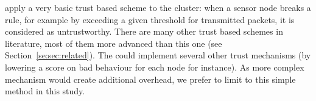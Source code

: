 \cns apply a very basic trust based scheme to the cluster: when a sensor node breaks a rule, for example by exceeding a given threshold for transmitted packets, it is considered as untrustworthy.
There are many other trust based schemes in literature, most of them more advanced than this one (see Section~\ref{se:sec:related}).
The \cns could implement several other trust mechanisms (by lowering a score on bad behaviour for each node for instance).
As more complex mechanism would create additional overhead, we prefer to limit to this simple method in this study.
%
%
%

